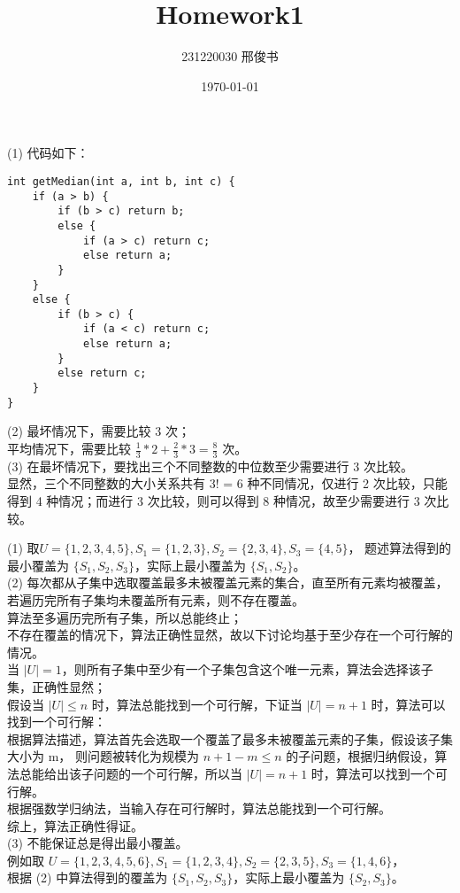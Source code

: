 \documentclass[12pt, a4paper, oneside]{ctexart}
\title{\textbf{Homework1}}
\author{231220030 邢俊书}
\date{\today}
\begin{document}
\maketitle
\begin{solution}[1.2]
(1) 代码如下：
\begin{verbatim}
int getMedian(int a, int b, int c) {
    if (a > b) {
        if (b > c) return b;
        else {
            if (a > c) return c;
            else return a;
        }
    }
    else {
        if (b > c) {
            if (a < c) return c;
            else return a;
        }
        else return c;
    }
}
\end{verbatim}
(2) 最坏情况下，需要比较 3 次；
\\平均情况下，需要比较 $\frac{1}{3} * 2 + \frac{2}{3} * 3 = \frac{8}{3}$ 次。
\\(3) 在最坏情况下，要找出三个不同整数的中位数至少需要进行 3 次比较。
\\显然，三个不同整数的大小关系共有 3! = 6 种不同情况，仅进行 2 次比较，只能得到 4 种情况；而进行 3 次比较，则可以得到 8 种情况，故至少需要进行 3 次比较。
\end{solution}

\begin{solution}[1.3]
(1) 取$U = \{1, 2, 3, 4, 5\}, S_1 = \{1, 2, 3\}, S_2 = \{2, 3, 4\}, S_3 = \{4, 5\}$，
题述算法得到的最小覆盖为 $\{S_1, S_2, S_3\}$，实际上最小覆盖为 $\{S_1, S_2\}$。
\\(2) 每次都从子集中选取覆盖最多未被覆盖元素的集合，直至所有元素均被覆盖，若遍历完所有子集均未覆盖所有元素，则不存在覆盖。
\\算法至多遍历完所有子集，所以总能终止；
\\不存在覆盖的情况下，算法正确性显然，故以下讨论均基于至少存在一个可行解的情况。
\\当 $|U| = 1$，则所有子集中至少有一个子集包含这个唯一元素，算法会选择该子集，正确性显然；
\\假设当 $|U| \leq n$ 时，算法总能找到一个可行解，下证当 $|U| = n + 1$ 时，算法可以找到一个可行解：
\\根据算法描述，算法首先会选取一个覆盖了最多未被覆盖元素的子集，假设该子集大小为 m，
则问题被转化为规模为 $n + 1 - m \leq n$ 的子问题，根据归纳假设，算法总能给出该子问题的一个可行解，所以当 $|U| = n + 1$ 时，算法可以找到一个可行解。
\\根据强数学归纳法，当输入存在可行解时，算法总能找到一个可行解。
\\综上，算法正确性得证。
\\(3) 不能保证总是得出最小覆盖。
\\例如取 $U = \{1, 2, 3, 4, 5, 6\}, S_1 = \{1, 2, 3, 4\}, S_2 = \{2, 3, 5\}, S_3 = \{1, 4, 6\}$，
\\根据 (2) 中算法得到的覆盖为 $\{S_1, S_2, S_3\}$，实际上最小覆盖为 $\{S_2, S_3\}$。
\end{solution}
\end{document}
